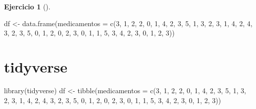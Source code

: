 \documentclass[
  spanish,
  a4paper,
]{scrreport}
\newenvironment{Shaded}{\begin{snugshade}}{\end{snugshade}}
\newcommand{\AttributeTok}[1]{\textcolor[rgb]{0.40,0.45,0.13}{#1}}
\newcommand{\DecValTok}[1]{\textcolor[rgb]{0.68,0.00,0.00}{#1}}
\newcommand{\FunctionTok}[1]{\textcolor[rgb]{0.28,0.35,0.67}{#1}}
\newcommand{\NormalTok}[1]{\textcolor[rgb]{0.00,0.23,0.31}{#1}}
\newcommand{\OtherTok}[1]{\textcolor[rgb]{0.00,0.23,0.31}{#1}}
\theoremstyle{definition}
\newtheorem{exercise}{Ejercicio}[chapter]
\theoremstyle{remark}
\begin{document}
\begin{exercise}[]
\begin{enumerate}
\begin{tcolorbox}
\begin{Shaded}
\begin{Highlighting}[]
\NormalTok{df }\OtherTok{\textless{}{-}} \FunctionTok{data.frame}\NormalTok{(}\AttributeTok{medicamentos =} \FunctionTok{c}\NormalTok{(}\DecValTok{3}\NormalTok{, }\DecValTok{1}\NormalTok{, }\DecValTok{2}\NormalTok{, }\DecValTok{2}\NormalTok{, }\DecValTok{0}\NormalTok{, }\DecValTok{1}\NormalTok{, }\DecValTok{4}\NormalTok{, }\DecValTok{2}\NormalTok{, }\DecValTok{3}\NormalTok{, }\DecValTok{5}\NormalTok{, }\DecValTok{1}\NormalTok{, }\DecValTok{3}\NormalTok{, }\DecValTok{2}\NormalTok{, }\DecValTok{3}\NormalTok{, }\DecValTok{1}\NormalTok{, }\DecValTok{4}\NormalTok{, }\DecValTok{2}\NormalTok{, }\DecValTok{4}\NormalTok{, }\DecValTok{3}\NormalTok{, }\DecValTok{2}\NormalTok{, }\DecValTok{3}\NormalTok{, }\DecValTok{5}\NormalTok{, }\DecValTok{0}\NormalTok{, }\DecValTok{1}\NormalTok{, }\DecValTok{2}\NormalTok{, }\DecValTok{0}\NormalTok{, }\DecValTok{2}\NormalTok{, }\DecValTok{3}\NormalTok{, }\DecValTok{0}\NormalTok{, }\DecValTok{1}\NormalTok{, }\DecValTok{1}\NormalTok{, }\DecValTok{5}\NormalTok{, }\DecValTok{3}\NormalTok{, }\DecValTok{4}\NormalTok{, }\DecValTok{2}\NormalTok{, }\DecValTok{3}\NormalTok{, }\DecValTok{0}\NormalTok{, }\DecValTok{1}\NormalTok{, }\DecValTok{2}\NormalTok{, }\DecValTok{3}\NormalTok{))}
\end{Highlighting}
\end{Shaded}

  \section{tidyverse}

\begin{Shaded}
\begin{Highlighting}[]
\FunctionTok{library}\NormalTok{(tidyverse)}
\NormalTok{df }\OtherTok{\textless{}{-}} \FunctionTok{tibble}\NormalTok{(}\AttributeTok{medicamentos =} \FunctionTok{c}\NormalTok{(}\DecValTok{3}\NormalTok{, }\DecValTok{1}\NormalTok{, }\DecValTok{2}\NormalTok{, }\DecValTok{2}\NormalTok{, }\DecValTok{0}\NormalTok{, }\DecValTok{1}\NormalTok{, }\DecValTok{4}\NormalTok{, }\DecValTok{2}\NormalTok{, }\DecValTok{3}\NormalTok{, }\DecValTok{5}\NormalTok{, }\DecValTok{1}\NormalTok{, }\DecValTok{3}\NormalTok{, }\DecValTok{2}\NormalTok{, }\DecValTok{3}\NormalTok{, }\DecValTok{1}\NormalTok{, }\DecValTok{4}\NormalTok{, }\DecValTok{2}\NormalTok{, }\DecValTok{4}\NormalTok{, }\DecValTok{3}\NormalTok{, }\DecValTok{2}\NormalTok{, }\DecValTok{3}\NormalTok{, }\DecValTok{5}\NormalTok{, }\DecValTok{0}\NormalTok{, }\DecValTok{1}\NormalTok{, }\DecValTok{2}\NormalTok{, }\DecValTok{0}\NormalTok{, }\DecValTok{2}\NormalTok{, }\DecValTok{3}\NormalTok{, }\DecValTok{0}\NormalTok{, }\DecValTok{1}\NormalTok{, }\DecValTok{1}\NormalTok{, }\DecValTok{5}\NormalTok{, }\DecValTok{3}\NormalTok{, }\DecValTok{4}\NormalTok{, }\DecValTok{2}\NormalTok{, }\DecValTok{3}\NormalTok{, }\DecValTok{0}\NormalTok{, }\DecValTok{1}\NormalTok{, }\DecValTok{2}\NormalTok{, }\DecValTok{3}\NormalTok{))}
\end{Highlighting}
\end{Shaded}


\end{tcolorbox}
\end{enumerate}
\end{exercise}
\end{document}
